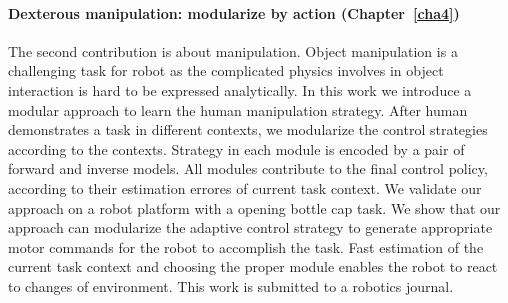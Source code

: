 
\paragraph{Dexterous manipulation: modularize by action (Chapter~\ref{cha4})}
The second contribution is about manipulation. Object manipulation is a challenging task for robot as the complicated physics involves in object interaction is hard to be expressed analytically. In this work we introduce a modular approach to learn the human manipulation strategy. After human demonstrates a task in different contexts, we modularize the control strategies according to the contexts. Strategy in each module is encoded by a pair of forward and inverse models. All modules contribute to the final control policy, according to their estimation errores of current task context. We validate our approach on a robot platform with a opening bottle cap task. We show that our approach can modularize the adaptive control strategy to generate appropriate motor commands for the robot to accomplish the task. Fast estimation of the current task context and choosing the proper module enables the robot to react to changes of environment. This work is submitted to a robotics journal.


